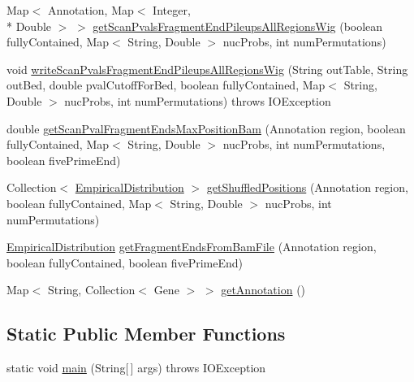 \begin{DoxyCompactItemize}
\item 
Map$<$ Annotation, Map$<$ Integer, \\*
Double $>$ $>$ \hyperlink{classbroad_1_1pda_1_1seq_1_1clip_1_1_pileup_ae5bf54f9ea963c4d704bb7f2dd98c0ee}{get\+Scan\+Pvals\+Fragment\+End\+Pileups\+All\+Regions\+Wig} (boolean fully\+Contained, Map$<$ String, Double $>$ nuc\+Probs, int num\+Permutations)
\item 
void \hyperlink{classbroad_1_1pda_1_1seq_1_1clip_1_1_pileup_ac4e8a5dd5705c5e479d1ed70e1d1852f}{write\+Scan\+Pvals\+Fragment\+End\+Pileups\+All\+Regions\+Wig} (String out\+Table, String out\+Bed, double pval\+Cutoff\+For\+Bed, boolean fully\+Contained, Map$<$ String, Double $>$ nuc\+Probs, int num\+Permutations)  throws I\+O\+Exception 
\item 
double \hyperlink{classbroad_1_1pda_1_1seq_1_1clip_1_1_pileup_af7726e161df33f1675b770110193078f}{get\+Scan\+Pval\+Fragment\+Ends\+Max\+Position\+Bam} (Annotation region, boolean fully\+Contained, Map$<$ String, Double $>$ nuc\+Probs, int num\+Permutations, boolean five\+Prime\+End)
\item 
Collection$<$ \hyperlink{classbroad_1_1core_1_1math_1_1_empirical_distribution}{Empirical\+Distribution} $>$ \hyperlink{classbroad_1_1pda_1_1seq_1_1clip_1_1_pileup_a9da41d6224e8d98d57989bf58c16190a}{get\+Shuffled\+Positions} (Annotation region, boolean fully\+Contained, Map$<$ String, Double $>$ nuc\+Probs, int num\+Permutations)
\item 
\hyperlink{classbroad_1_1core_1_1math_1_1_empirical_distribution}{Empirical\+Distribution} \hyperlink{classbroad_1_1pda_1_1seq_1_1clip_1_1_pileup_a9d35efcf06921f02594aef226c6862d4}{get\+Fragment\+Ends\+From\+Bam\+File} (Annotation region, boolean fully\+Contained, boolean five\+Prime\+End)
\item 
Map$<$ String, Collection$<$ Gene $>$ $>$ \hyperlink{classbroad_1_1pda_1_1seq_1_1clip_1_1_pileup_a25885ff6ffd5befe82971e505b35ce81}{get\+Annotation} ()
\end{DoxyCompactItemize}
\subsection*{Static Public Member Functions}
\begin{DoxyCompactItemize}
\item 
static void \hyperlink{classbroad_1_1pda_1_1seq_1_1clip_1_1_pileup_adb48168b821ea257a6510ed8af7cd09a}{main} (String\mbox{[}$\,$\mbox{]} args)  throws I\+O\+Exception 
\end{DoxyCompactItemize}


